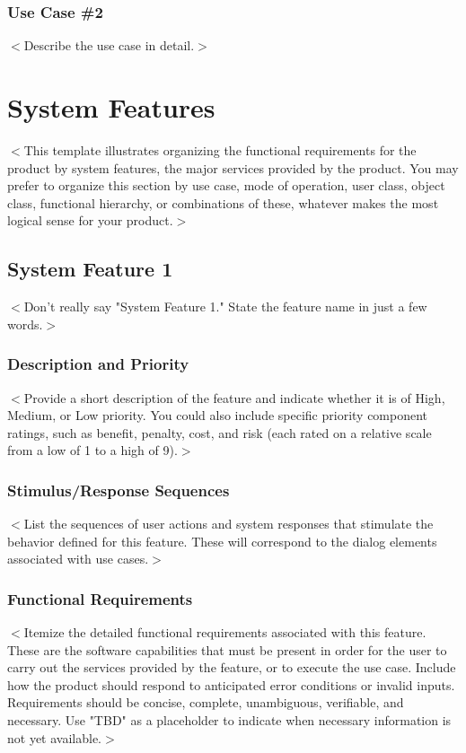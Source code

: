 \documentclass[a4paper, 11pt]{scrreprt}
\begin{document}
\subsection{Use Case \#2}
$<$Describe the use case in detail.$>$



\chapter{System Features}
$<$This template illustrates organizing the functional requirements for the 
product by system features, the major services provided by the product. You may 
prefer to organize this section by use case, mode of operation, user class, 
object class, functional hierarchy, or combinations of these, whatever makes the 
most logical sense for your product.$>$

\section{System Feature 1}
$<$Don't really say "System Feature 1." State the feature name in just a few 
words.$>$

\subsection{Description and Priority}
$<$Provide a short description of the feature and indicate whether it is of 
High, Medium, or Low priority. You could also include specific priority 
component ratings, such as benefit, penalty, cost, and risk (each rated on a 
relative scale from a low of 1 to a high of 9).$>$

\subsection{Stimulus/Response Sequences}
$<$List the sequences of user actions and system responses that stimulate the 
behavior defined for this feature. These will correspond to the dialog elements 
associated with use cases.$>$

\subsection{Functional Requirements}
$<$Itemize the detailed functional requirements associated with this feature.  
These are the software capabilities that must be present in order for the user 
to carry out the services provided by the feature, or to execute the use case.  
Include how the product should respond to anticipated error conditions or 
invalid inputs. Requirements should be concise, complete, unambiguous, 
verifiable, and necessary. Use "TBD" as a placeholder to indicate when necessary 
information is not yet available.$>$
\end{document}
